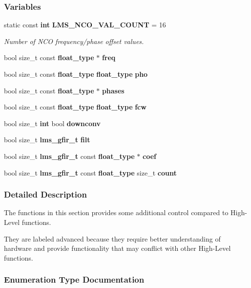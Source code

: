 \subsubsection*{Variables}
\begin{DoxyCompactItemize}
\item 
static const {\bf int} {\bf L\+M\+S\+\_\+\+N\+C\+O\+\_\+\+V\+A\+L\+\_\+\+C\+O\+U\+NT} = 16
\begin{DoxyCompactList}\small\item\em Number of N\+CO frequency/phase offset values. \end{DoxyCompactList}\item 
bool size\+\_\+t const {\bf float\+\_\+type} $\ast$ {\bf freq}
\item 
bool size\+\_\+t const {\bf float\+\_\+type} {\bf float\+\_\+type} {\bf pho}
\item 
bool size\+\_\+t const {\bf float\+\_\+type} $\ast$ {\bf phases}
\item 
bool size\+\_\+t const {\bf float\+\_\+type} {\bf float\+\_\+type} {\bf fcw}
\item 
bool size\+\_\+t {\bf int} bool {\bf downconv}
\item 
bool size\+\_\+t {\bf lms\+\_\+gfir\+\_\+t} {\bf filt}
\item 
bool size\+\_\+t {\bf lms\+\_\+gfir\+\_\+t} const {\bf float\+\_\+type} $\ast$ {\bf coef}
\item 
bool size\+\_\+t {\bf lms\+\_\+gfir\+\_\+t} const {\bf float\+\_\+type} size\+\_\+t {\bf count}
\end{DoxyCompactItemize}


\subsubsection{Detailed Description}
The functions in this section provides some additional control compared to High-\/\+Level functions. 

They are labeled advanced because they require better understanding of hardware and provide functionality that may conflict with other High-\/\+Level functions. 

\subsubsection{Enumeration Type Documentation}
